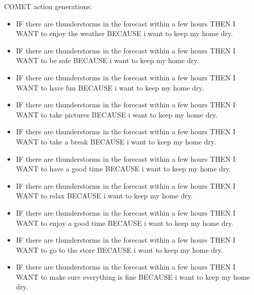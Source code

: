 COMET action generations:
\begin{itemize}
\item IF there are thunderstorms in the forecast within a few hours THEN I WANT to enjoy the weather BECAUSE i want to keep my home dry.
\item IF there are thunderstorms in the forecast within a few hours THEN I WANT to be safe BECAUSE i want to keep my home dry.
\item IF there are thunderstorms in the forecast within a few hours THEN I WANT to have fun BECAUSE i want to keep my home dry.
\item IF there are thunderstorms in the forecast within a few hours THEN I WANT to take pictures BECAUSE i want to keep my home dry.
\item IF there are thunderstorms in the forecast within a few hours THEN I WANT to take a break BECAUSE i want to keep my home dry.
\item IF there are thunderstorms in the forecast within a few hours THEN I WANT to have a good time BECAUSE i want to keep my home dry.
\item IF there are thunderstorms in the forecast within a few hours THEN I WANT to relax BECAUSE i want to keep my home dry.
\item IF there are thunderstorms in the forecast within a few hours THEN I WANT to enjoy a good time BECAUSE i want to keep my home dry.
\item IF there are thunderstorms in the forecast within a few hours THEN I WANT to go to the store BECAUSE i want to keep my home dry.
\item IF there are thunderstorms in the forecast within a few hours THEN I WANT to make sure everything is fine BECAUSE i want to keep my home dry.
\end{itemize}